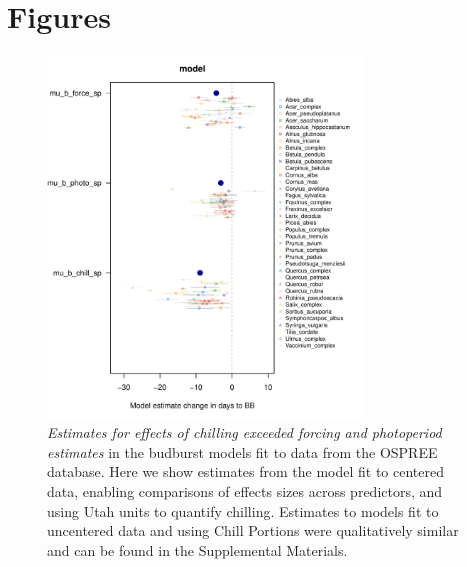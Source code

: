 \documentclass{article}
\begin{document}

\section* {Figures}

\newpage

\begin{figure}[h!]
\centering
\noindent \includegraphics[width=0.75\textwidth]{..//..//analyses/bb_analysis/figures/muplotmodelspcompexprampfputah_z.pdf}
\caption{\emph{Estimates for effects of chilling exceeded forcing and photoperiod estimates} in the budburst models fit to data from the OSPREE database. Here we show estimates from the model fit to centered data, enabling comparisons of effects sizes across predictors, and using Utah units to quantify chilling. Estimates to models fit to uncentered data and using Chill Portions were qualitatively similar and can be found in the Supplemental Materials.} 
\label{fig:mu}
\end{figure}
\end{document}
